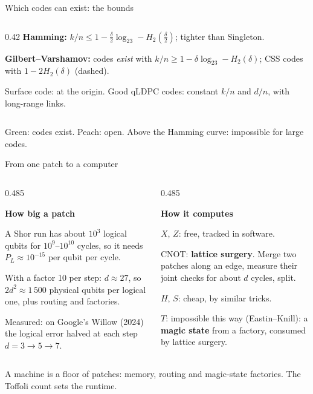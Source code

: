 \documentclass[aspectratio=169,11pt]{beamer}
\newcommand{\cnt}[1]{\textcolor{cblue}{#1}}
\newcommand{\per}[1]{\textcolor{cpurple}{#1}}
\newcommand{\blocktitle}[1]{{\bfseries #1}\par\vskip1mm}
\begin{document}
{\begin{frame}[noframenumbering]{Which codes can exist: the bounds}
\begin{columns}[T,onlytextwidth]
\begin{column}{0.42\textwidth}
      \per{\textbf{Hamming:}} $k/n\le1-\tfrac{\delta}{2}\log_23-H_2(\tfrac{\delta}{2})$; tighter than Singleton.\par\vskip0.8mm
      \cnt{\textbf{Gilbert--Varshamov:}} codes \emph{exist} with $k/n\ge1-\delta\log_23-H_2(\delta)$; CSS codes with $1-2H_2(\delta)$ (dashed).\par\vskip0.8mm
      Surface code: at the origin. Good qLDPC codes: constant $k/n$ and $d/n$, with long-range links.
    \end{column}
  \end{columns}
  \vskip1mm
  \begin{takeaway}Green: codes exist. Peach: open. Above the Hamming curve: impossible for large codes.\end{takeaway}
\end{frame}}

{
\begin{frame}[noframenumbering]{From one patch to a computer}
  \begin{columns}[T,onlytextwidth]
    \begin{column}{0.485\textwidth}
      \begin{panel}[equal height group=sc2]
        \blocktitle{How big a patch}
        \small
        A Shor run has about $10^3$ logical qubits for $10^9$--$10^{10}$ cycles, so it needs $P_L\approx10^{-15}$ per qubit per cycle.\par\vskip1mm
        With a factor 10 per step: $d\approx27$, so $2d^2\approx1\,500$ physical qubits per logical one, plus routing and factories.\par\vskip1mm
        Measured: on Google's Willow (2024) the logical error halved at each step $d=3\to5\to7$.
      \end{panel}
    \end{column}
    \begin{column}{0.485\textwidth}
      \begin{panel}[equal height group=sc2]
        \blocktitle{How it computes}
        \small
        $X$, $Z$: free, tracked in software.\par\vskip1mm
        CNOT: \textbf{lattice surgery}. Merge two patches along an edge, measure their joint checks for about $d$ cycles, split.\par\vskip1mm
        $H$, $S$: cheap, by similar tricks.\par\vskip1mm
        $T$: impossible this way (Eastin--Knill): a \textbf{magic state} from a factory, consumed by lattice surgery.
      \end{panel}
    \end{column}
  \end{columns}
  \vskip1mm
  \begin{takeaway}A machine is a floor of patches: memory, routing and magic-state factories. The Toffoli count sets the runtime.\end{takeaway}
\end{frame}}
\end{document}
